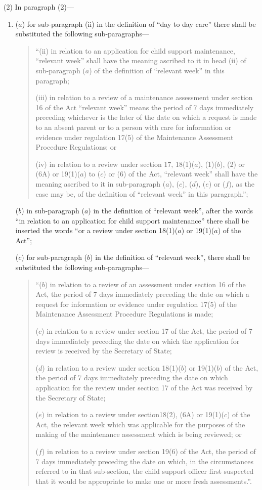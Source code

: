 \documentclass[12pt,a4paper]{article}
\begin{document}
(2) In paragraph (2)—
\begin{enumerate}\item[]
($a$) for sub-paragraph (ii) in the definition of “day to day care” there shall be substituted the following sub-paragraphs—
\begin{quotation}
“(ii) in relation to an application for child support maintenance, “relevant week” shall have the meaning ascribed to it in head (ii) of sub-paragraph ($a$) of the definition of “relevant week” in this paragraph;

(iii) in relation to a review of a maintenance assessment under section 16 of the Act “relevant week” means the period of 7 days immediately preceding whichever is the later of the date on which a request is made to an absent parent or to a person with care for information or evidence under regulation 17(5) of the Maintenance Assessment Procedure Regulations; or

(iv) in relation to a review under section 17, 18(1)($a$), (1)($b$), (2) or (6A) or 19(1)($a$) to ($c$) or (6) of the Act, “relevant week” shall have the meaning ascribed to it in sub-paragraph ($a$), ($c$), ($d$), ($e$) or ($f$), as the case may be, of the definition of “relevant week” in this paragraph.”;
\end{quotation}

($b$) in sub-paragraph ($a$) in the definition of “relevant week”, after the words “in relation to an application for child support maintenance” there shall be inserted the words “or a review under section 18(1)($a$) or 19(1)($a$) of the Act”;

($c$) for sub-paragraph ($b$) in the definition of “relevant week”, there shall be substituted the following sub-paragraphs—
\begin{quotation}
“($b$) in relation to a review of an assessment under section 16 of the Act, the period of 7 days immediately preceding the date on which a request for information or evidence under regulation 17(5) of the Maintenance Assessment Procedure Regulations is made;

($c$) in relation to a review under section 17 of the Act, the period of 7 days immediately preceding the date on which the application for review is received by the Secretary of State;

($d$) in relation to a review under section 18(1)($b$) or 19(1)($b$) of the Act, the period of 7 days immediately preceding the date on which application for the review under section 17 of the Act was received by the Secretary of State;

($e$) in relation to a review under section18(2), (6A) or 19(1)($c$) of the Act, the relevant week which was applicable for the purposes of the making of the maintenance assessment which is being reviewed; or

($f$) in relation to a review under section 19(6) of the Act, the period of 7 days immediately preceding the date on which, in the circumstances referred to in that sub-section, the child support officer first suspected that it would be appropriate to make one or more fresh assessments.”.
\end{quotation}
\end{enumerate}
\end{document}
